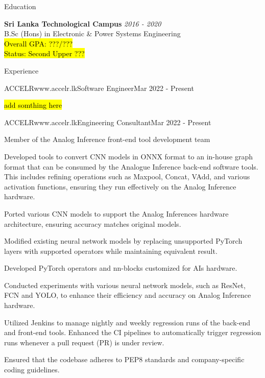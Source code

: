 \documentclass[
	11pt, %
]{./assets/resume} %
\begin{document}
\begin{rSection}{Education}

	\textbf{Sri Lanka Technological Campus} \hfill \textit{2016 - 2020} \\ 
    B.Sc (Hons) in Electronic \& Power Systems Engineering \\
	\hl{Overall GPA: ???/???} \\
	\hl{Status: Second Upper ??? }
	
\end{rSection}


\begin{rSection}{Experience}

	\begin{rSubsectionX}{ACCELR}{www.accelr.lk}{Software Engineer}{Mar 2022 - Present}
        \item \hl{add somthing here}
	\end{rSubsectionX}

	\begin{rSubsectionX}{ACCELR}{www.accelr.lk}{Engineering Consultant}{Mar 2022 - Present}
		\item Member of the Analog Inference front-end tool development team
        \item Developed tools to convert CNN models in ONNX format to an in-house graph format that can be consumed by the Analogue Inference back-end software tools. This includes refining operations such as Maxpool, Concat, VAdd, and various activation functions, ensuring they run effectively on the Analog Inference hardware.
        \item Ported various CNN models to support the Analog Inferences hardware architecture, ensuring accuracy matches original models.
        \item Modified existing neural network models by replacing unsupported PyTorch layers with supported operators while maintaining equivalent result.
        \item Developed PyTorch operators and nn-blocks customized for AIs hardware.
        \item Conducted experiments with various neural network models, such as ResNet, FCN and YOLO, to enhance their efficiency and accuracy on Analog Inference hardware.
        \item Utilized Jenkins to manage nightly and weekly regression runs of the back-end and front-end tools. Enhanced the CI pipelines to automatically trigger regression runs whenever a pull request (PR) is under review.
        \item Ensured that the codebase adheres to PEP8 standards and company-specific coding guidelines.
	\end{rSubsectionX}


\end{rSection}
\end{document}
